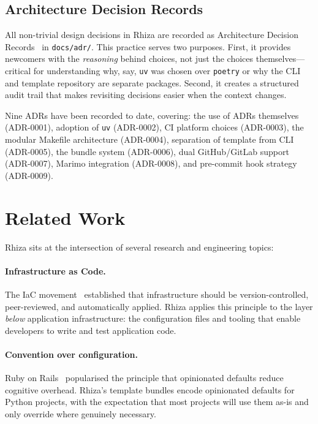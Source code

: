 \documentclass[12pt,a4paper]{article}
\begin{document}
\subsection{Architecture Decision Records}

All non-trivial design decisions in Rhiza are recorded as Architecture Decision Records~\cite{nygard2011adr} in \texttt{docs/adr/}. This practice serves two purposes. First, it provides newcomers with the \emph{reasoning} behind choices, not just the choices themselves---critical for understanding why, say, \texttt{uv} was chosen over \texttt{poetry} or why the CLI and template repository are separate packages. Second, it creates a structured audit trail that makes revisiting decisions easier when the context changes.

Nine ADRs have been recorded to date, covering: the use of ADRs themselves (ADR-0001), adoption of \texttt{uv} (ADR-0002), CI platform choices (ADR-0003), the modular Makefile architecture (ADR-0004), separation of template from CLI (ADR-0005), the bundle system (ADR-0006), dual GitHub/GitLab support (ADR-0007), Marimo integration (ADR-0008), and pre-commit hook strategy (ADR-0009).

\section{Related Work}
\label{sec:related}

Rhiza sits at the intersection of several research and engineering topics:

\paragraph{Infrastructure as Code.} The IaC movement~\cite{humble2010continuous} established that infrastructure should be version-controlled, peer-reviewed, and automatically applied. Rhiza applies this principle to the layer \emph{below} application infrastructure: the configuration files and tooling that enable developers to write and test application code.

\paragraph{Convention over configuration.} Ruby on Rails~\cite{rails} popularised the principle that opinionated defaults reduce cognitive overhead. Rhiza's template bundles encode opinionated defaults for Python projects, with the expectation that most projects will use them as-is and only override where genuinely necessary.
\end{document}
